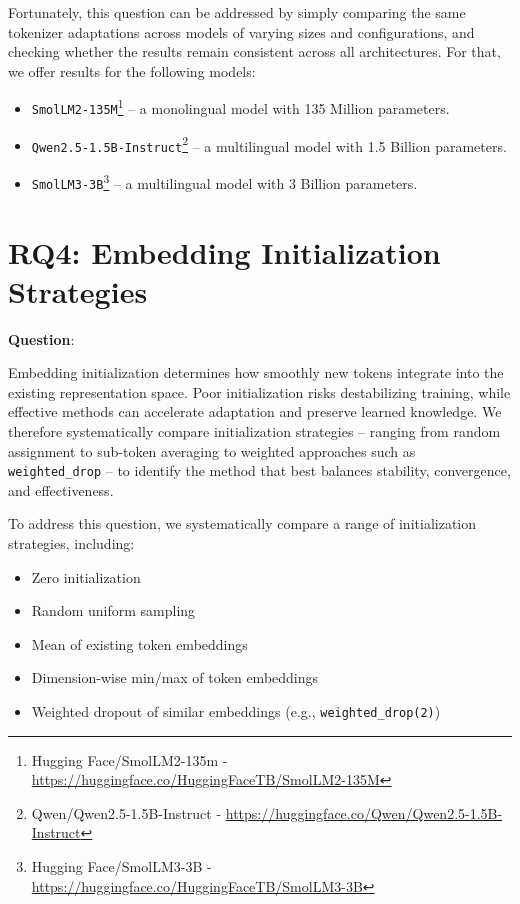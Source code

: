 Fortunately, this question can be addressed by simply comparing the same tokenizer adaptations across models of varying sizes and configurations, and checking whether the results remain consistent across all architectures. For that, we offer results for the following models:
\begin{itemize}
    \item \texttt{SmolLM2-135M}\footnote{Hugging Face/SmolLM2-135m - \url{https://huggingface.co/HuggingFaceTB/SmolLM2-135M}} – a monolingual model with 135 Million parameters.
    \item \texttt{Qwen2.5-1.5B-Instruct}\footnote{Qwen/Qwen2.5-1.5B-Instruct - \url{https://huggingface.co/Qwen/Qwen2.5-1.5B-Instruct}} – a multilingual model with 1.5 Billion parameters.
    \item \texttt{SmolLM3-3B}\footnote{Hugging Face/SmolLM3-3B - \url{https://huggingface.co/HuggingFaceTB/SmolLM3-3B}} – a multilingual model with 3 Billion parameters.
\end{itemize}


\section{RQ4: Embedding Initialization Strategies}
\label{sec:init_strategies}
\textbf{Question}: \textit{\RQfour}

Embedding initialization determines how smoothly new tokens integrate into the existing representation space. Poor initialization risks destabilizing training, while effective methods can accelerate adaptation and preserve learned knowledge. We therefore systematically compare initialization strategies -- ranging from random assignment to sub-token averaging to weighted approaches such as \texttt{weighted\_drop} -- to identify the method that best balances stability, convergence, and effectiveness.

To address this question, we systematically compare a range of initialization strategies, including:
\begin{itemize}
    \item Zero initialization
    \item Random uniform sampling
    \item Mean of existing token embeddings
    \item Dimension-wise min/max of token embeddings
    \item Weighted dropout of similar embeddings (e.g., \texttt{weighted\_drop(2)})
\end{itemize}

